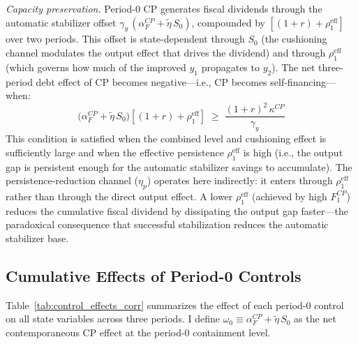 \documentclass[12pt, a4paper]{article}
\begin{document}
\textit{Capacity preservation.} Period-0 CP generates fiscal dividends through
the automatic stabilizer offset
$\gamma_y\, (\alpha_F^{CP} + \tilde{\eta}\, S_0)$, compounded by
$[(1+r) + \rho_1^{\mathrm{eff}}]$ over two periods. This offset is
state-dependent through $S_0$ (the cushioning channel modulates the output
effect that drives the dividend) and through $\rho_1^{\mathrm{eff}}$ (which
governs how much of the improved $y_1$ propagates to $y_2$). The net
three-period debt effect of CP becomes negative---i.e., CP becomes
self-financing---when:
%
\begin{equation}
    \bigl(\alpha_F^{CP} + \tilde{\eta}\, S_0\bigr)
    \left[(1+r) + \rho_1^{\mathrm{eff}}\right]
    \;\geq\;
    \frac{(1+r)^2\, \kappa^{CP}}{\gamma_y}
    \label{eq:CP_selffinancing_corr}
\end{equation}
%
This condition is satisfied when the combined level and cushioning effect is
sufficiently large and when the effective persistence $\rho_1^{\mathrm{eff}}$
is high (i.e., the output gap is persistent enough for the automatic stabilizer
savings to accumulate). The persistence-reduction channel ($\eta_p$) operates
here indirectly: it enters through $\rho_1^{\mathrm{eff}}$ rather than through
the direct output effect. A lower $\rho_1^{\mathrm{eff}}$ (achieved by high
$F_1^{CP}$) reduces the cumulative fiscal dividend by dissipating the output
gap faster---the paradoxical consequence that successful stabilization reduces
the automatic stabilizer base.


\subsection{Cumulative Effects of Period-0 Controls}
\label{app:cumulative}

Table~\ref{tab:control_effects_corr} summarizes the effect of each period-0
control on all state variables across three periods. I define
$\omega_0 \equiv \alpha_F^{CP} + \tilde{\eta}\, S_0$ as the net
contemporaneous CP effect at the period-0 containment level.
\end{document}
